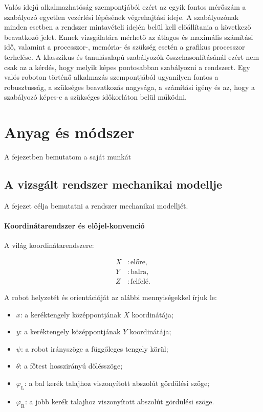\documentclass[12pt,a4paper]{report}
\newcommand{\phiL}{\varphi_{\mathrm{L}}}
\newcommand{\phiR}{\varphi_{\mathrm{R}}}
\begin{document}
	\newline
	\newline
	Valós idejű alkalmazhatóság szempontjából ezért az egyik fontos mérőszám a szabályozó egyetlen vezérlési lépésének végrehajtási ideje. A szabályozónak minden esetben a rendszer mintavételi idején belül kell előállítania a következő beavatkozó jelet. Ennek vizsgálatára mérhető az átlagos és maximális számítási idő, valamint a processzor-, memória- és szükség esetén a grafikus processzor terhelése.
	\newline
	\newline
	A klasszikus és tanulásalapú szabályozók összehasonlításánál ezért nem csak az a kérdés, hogy melyik képes pontosabban szabályozni a rendszert. Egy valós roboton történő alkalmazás szempontjából ugyanilyen fontos a robusztusság, a szükséges beavatkozás nagysága, a számítási igény és az, hogy a szabályozó képes-e a szükséges időkorláton belül működni.

	\chapter{Anyag és módszer}
	
	A fejezetben bemutatom a saját munkát
	
	\section{A vizsgált rendszer mechanikai modellje}

	A fejezet célja bemutatni a rendszer mechanikai modelljét.
	
	\subsubsection{Koordinátarendszer és előjel-konvenció}
	
	A világ koordinátarendszere:
	
	\begin{align*}
		X &: \text{előre},\\
		Y &: \text{balra},\\
		Z &: \text{felfelé}.
	\end{align*}
	
	
	A robot helyzetét és orientációját az alábbi mennyiségekkel írjuk le:
	
	\begin{itemize}
		\item $x$: a keréktengely középpontjának $X$ koordinátája;
		\item $y$: a keréktengely középpontjának $Y$ koordinátája;
		\item $\psi$: a robot irányszöge a függőleges tengely körül;
		\item $\theta$: a főtest hosszirányú dőlésszöge;
		\item $\phiL$: a bal kerék talajhoz viszonyított abszolút gördülési szöge;
		\item $\phiR$: a jobb kerék talajhoz viszonyított abszolút gördülési szöge.
	\end{itemize}
	
\end{document}

